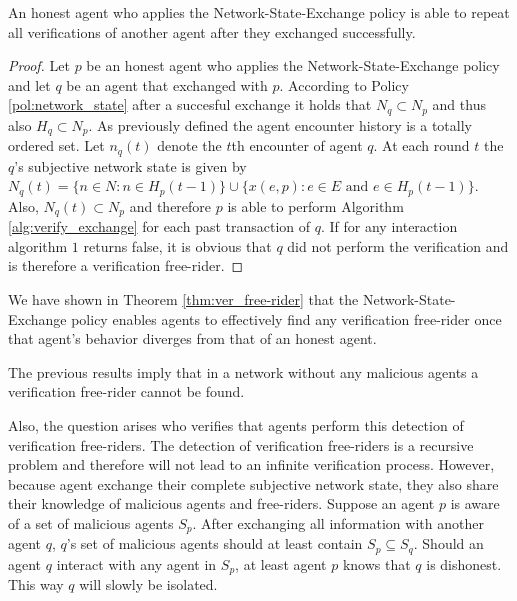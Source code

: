 \begin{thm}
    \label{thm:ver_free-rider}
    An honest agent who applies the Network-State-Exchange policy is able to repeat all verifications
    of another agent after they exchanged successfully.
\end{thm}
\begin{proof}
    Let $p$ be an honest agent who applies the Network-State-Exchange policy and let $q$ be an agent
    that exchanged with $p$. According to Policy \ref{pol:network_state} after a succesful exchange
    it holds that $N_q \subset N_p$ and thus also $H_q \subset N_p$. As previously defined the agent encounter
    history is a totally ordered set. Let $n_q(t)$ denote the $t$th encounter of agent $q$. At each
    round $t$ the $q$'s subjective network state is given by $N_q(t) = \{ n \in N : n \in H_p(t-1) \} \cup \{ x(e, p) : e \in E \text{ and } e \in H_p(t-1) \}$.
    Also, $N_q(t) \subset N_p$ and therefore $p$ is able to perform Algorithm \ref{alg:verify_exchange}
    for each past transaction of $q$. If for any interaction algorithm $1$ returns false, it is 
    obvious that $q$ did not perform the verification and is therefore a verification free-rider.
\end{proof}

We have shown in Theorem \ref{thm:ver_free-rider} that the Network-State-Exchange policy enables 
agents to effectively find any verification free-rider once that agent's behavior diverges from that
of an honest agent. 

The previous results imply that in a network without any malicious agents a 
verification free-rider cannot be found. 

Also, the question arises who verifies that agents perform this detection of verification 
free-riders. The detection of verification free-riders is a recursive problem and therefore will not
lead to an infinite verification process. However, because agent exchange their complete subjective
network state, they also share their knowledge of malicious agents and free-riders. Suppose an agent
$p$ is aware of a set of malicious agents $S_p$. After exchanging all information with another agent
$q$, $q$'s set of malicious agents should at least contain $S_p \subseteq S_q$. Should an agent $q$ 
interact with any agent in $S_p$, at least agent $p$ knows that $q$ is dishonest. This way $q$ will 
slowly be isolated.

